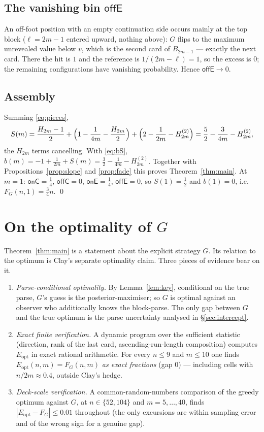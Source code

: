 \documentclass[11pt]{article}
\theoremstyle{definition}
\newcommand{\eopt}{E_{\mathrm{opt}}}
\newcommand{\Fg}{F_G}
\begin{document}
\subsection{The vanishing bin \texorpdfstring{$\mathsf{offE}$}{offE}}
An off-foot position with an empty continuation side occurs mainly at the top block
($\ell=2m-1$ entered upward, nothing above): $G$ flips to the maximum unrevealed value below
$v$, which is the second card of $B_{2m-1}$ --- exactly the next card. There the hit is $1$ and
the reference is $1/(2m-\ell)=1$, so the excess is $0$; the remaining configurations have
vanishing probability. Hence $\mathsf{offE}\to0$.

\subsection{Assembly}
Summing \eqref{eq:pieces},
\[
  S(m)=\frac{H_{2m}-1}{2}+\Bigl(1-\frac1{4m}-\frac{H_{2m}}{2}\Bigr)+\Bigl(2-\frac1{2m}-H_{2m}^{(2)}\Bigr)
  =\frac52-\frac{3}{4m}-H_{2m}^{(2)},
\]
the $H_{2m}$ terms cancelling. With \eqref{eq:bS}, $b(m)=-1+\frac1{2m}+S(m)=\frac32-\frac1{4m}
-H_{2m}^{(2)}$. Together with Propositions~\ref{prop:slope} and \ref{prop:fade} this proves
Theorem~\ref{thm:main}. At $m=1$: $\mathsf{onC}=\tfrac14$, $\mathsf{offC}=0$,
$\mathsf{onE}=\tfrac14$, $\mathsf{offE}=0$, so $S(1)=\tfrac12$ and $b(1)=0$, i.e.\
$\Fg(n,1)=\tfrac34n$. \qed

\section{On the optimality of \texorpdfstring{$G$}{G}}\label{sec:opt}

Theorem~\ref{thm:main} is a statement about the explicit strategy $G$. Its relation to the
optimum is Clay's separate optimality claim. Three pieces of evidence bear on it.

\begin{enumerate}[topsep=2pt,itemsep=2pt]
  \item \emph{Parse-conditional optimality.} By Lemma~\ref{lem:key}, conditional on the true
        parse, $G$'s guess is the posterior-maximiser; so $G$ is optimal against an observer
        who additionally knows the block-parse. The only gap between $G$ and the true optimum
        is the parse uncertainty analysed in \S\ref{sec:intercept}.
  \item \emph{Exact finite verification.} A dynamic program over the sufficient statistic
        (direction, rank of the last card, ascending-run-length composition) computes $\eopt$
        in exact rational arithmetic. For every $n\le9$ and $m\le10$ one finds
        $\eopt(n,m)=\Fg(n,m)$ \emph{as exact fractions} (gap $0$) --- including cells with
        $n/2m\approx 0.4$, outside Clay's hedge.
  \item \emph{Deck-scale verification.} A common-random-numbers comparison of the greedy
        optimum against $G$, at $n\in\{52,104\}$ and $m=5,\dots,40$, finds
        $|\eopt-\Fg|\le0.01$ throughout (the only excursions are within sampling error and of
        the wrong sign for a genuine gap).
\end{enumerate}
\end{document}

